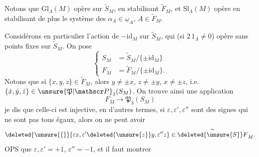 Notons que $\mathrm{Gl}_{\Lambda}(M)$ opère sur $\widetilde S_M$, en stabilisant $\widetilde F_M$, et $\mathrm{Sl}_{\Lambda}(M)$ opère en stabilisant de plus le système des $\alpha_A\in\underline{\omega}_A$, $A\in\widetilde F_M$.


Considérons en particulier l'action de  $-\mathrm{id}_M$ sur $\widetilde S_M$, qui (si $2\,1_{\Lambda}\ne0$) opère sans points fixes sur $\widetilde S_M$. On pose
\[
\left\{\begin{aligned}
S_M&=\widetilde S_M/\{\pm\mathrm{id}_M\}\\
F_M&=\widetilde F_M/\{\pm\mathrm{id}_M\}.
\end{aligned}\right.\tag*{(18)}
\]
Notons que si $\{x,y,z\}\in\widetilde F_M$, alors $y\ne\pm x$, $z\ne\pm y$, $x\ne\pm z$, i.e. $\{\dot x,\dot y,\dot z\}\in\unsure{\mathfrak P|\mathscr P}_3(S_M)$. On trouve ainsi une application
\[
F_M\longrightarrow\mathfrak P_3(S_M)
\]
je dis que celle-ci est injective, en d'autres termes,  si $\varepsilon,\varepsilon',\varepsilon''$   sont des signes qui ne sont pas tous égaux, alors on ne peut avoir
\[
\deleted{\unsure{\{}}\{\varepsilon x,\varepsilon'\deleted{\unsure{z}}y,\varepsilon''z\}\in\overset{\sim}{\deleted{\unsure{S}}F}_M.
\]
OPS que $\varepsilon,\varepsilon'=+1$, $\varepsilon''=-1$, et il faut montrer
